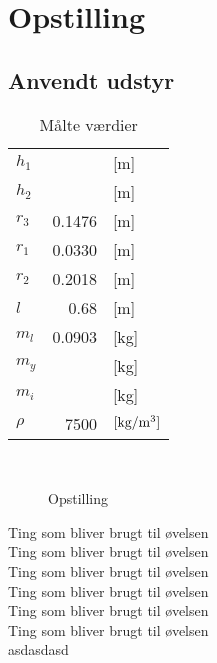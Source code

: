 \section{Opstilling}
\subsection*{Anvendt udstyr}
                                
\begin{wraptable}[2]{R}[2cm]{0.66\textwidth}
\vspace{-1.5\baselineskip}
  \begin{tabular}{lrl}
  \textbf{$h_{1}$}      &        & [m]  \\ 
  \textbf{$h_{2}$}      &        & [m]  \\   
  \textbf{$r_{3}$}      & 0.1476 & [m]  \\   
  \textbf{$r_{1}$}      & 0.0330 & [m]  \\  
  \textbf{$r_{2}$}      & 0.2018 & [m]  \\    
  \textbf{$l$}          & 0.68   & [m]  \\  
  \textbf{$m_{l}$}      & 0.0903 & [kg] \\
  \textbf{$m_{y}$}      &        & [kg] \\ 
  \textbf{$m_{i}$}      &        & [kg] \\
  \textbf{$\rho$}       & 7500   & $\left[\text{kg/m\textsuperscript{3}}\right]$  \\ 
  
  \end{tabular}
  \caption{Målte værdier}\label{tab:maal}
\end{wraptable}~
\begin{wrapfigure}[33]{R}[2cm]{0.66\textwidth}
\vspace{-6.5\baselineskip}
\par
{}
\par
{}
\caption{Opstilling}
\end{wrapfigure}
Ting som bliver brugt til øvelsen  \\
Ting som bliver brugt til øvelsen  \\
Ting som bliver brugt til øvelsen  \\
Ting som bliver brugt til øvelsen  \\
Ting som bliver brugt til øvelsen  \\
Ting som bliver brugt til øvelsen  \\
asdasdasd
                                   
